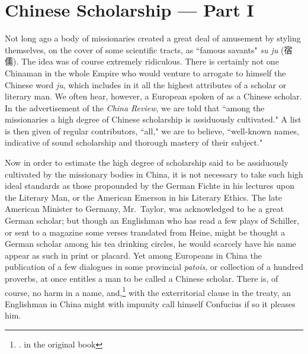 \chapter{Chinese Scholarship --- Part I}
Not long ago a body of missionaries created a great deal of amusement by styling themselves, on the cover of some scientific tracts, as ``famous savants" \emph{su ju} (宿儒).
The idea was of course extremely ridiculous.
There is certainly not one Chinaman in the whole Empire who would venture to arrogate to himself the Chinese word \emph{ju}, which includes in it all the highest attributes of a scholar or literary man.
We often hear, however, a European spoken of as a Chinese scholar.
In the advertisement of the \emph{China Review}, we are told that ``among the missionaries a high degree of Chinese scholarship is assiduously cultivated."
A list is then given of regular contributors, ``all," we are to believe, ``well-known names, indicative of sound scholarship and thorough mastery of their subject."

Now in order to estimate the high degree of scholarship said to be assiduously cultivated by the missionary bodies in China, it is not necessary to take such high ideal standards as those propounded by the German Fichte  in his lectures upon the Literary Man, or the American Emerson  in his Literary Ethics.
The late American Minister to Germany, Mr.~Taylor, was acknowledged to be a great German scholar; but though an Englishman who has read a few plays of Schiller,  or sent to a magazine some verses translated from Heine,  might be thought a German scholar among his tea drinking circles, he would scarcely have his name appear as such in print or placard.
Yet among Europeans in China the publication of a few dialogues in some provincial \emph{patois}, or collection of a hundred proverbs, at once entitles a man to be called a Chinese scholar.
There is, of course, no harm in a name, and,\footnote{. in the original book} with the exterritorial clause  in the treaty, an Englishman in China might with impunity call himself Confucius if so it pleases him.

